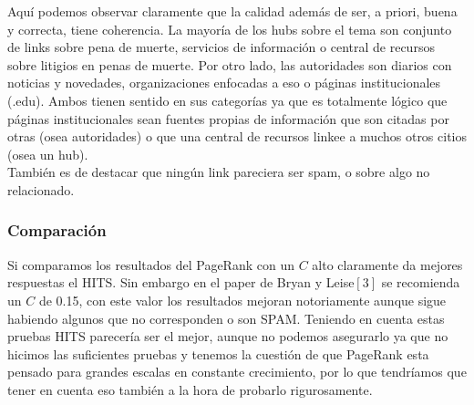 


Aquí podemos observar claramente que la calidad además de ser, a priori, buena y correcta, tiene coherencia. La mayoría de los hubs sobre el tema son conjunto de links sobre pena de muerte, servicios de información o 
central de recursos sobre litigios en penas de muerte. Por otro lado, las autoridades son diarios con noticias y novedades, organizaciones enfocadas a eso o páginas institucionales (.edu). Ambos tienen sentido en sus 
categorías ya que es totalmente lógico que páginas institucionales sean fuentes propias de información que son citadas por otras (osea autoridades) o que una central de recursos linkee a muchos otros citios (osea un hub).\\
También es de destacar que ningún link pareciera ser spam, o sobre algo no relacionado.

\subsubsection{Comparación}

Si comparamos los resultados del PageRank con un $C$ alto claramente da mejores respuestas el HITS. Sin embargo en el paper de Bryan y Leise$[3]$ se recomienda un $C$ de 0.15, con este valor los resultados mejoran notoriamente aunque sigue habiendo algunos que no corresponden o son SPAM. 
Teniendo en cuenta estas pruebas HITS parecería ser el mejor, aunque no podemos asegurarlo ya que no hicimos las suficientes pruebas y tenemos la cuestión de que PageRank esta pensado para grandes escalas en constante crecimiento, por lo que tendríamos que tener en cuenta eso también a la hora de probarlo rigurosamente.
